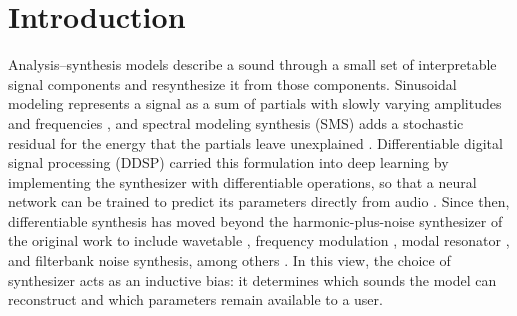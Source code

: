 
\section{Introduction}
\label{sec:intro}

Analysis--synthesis models describe a sound through a small set of interpretable signal components and resynthesize it from those components.
Sinusoidal modeling represents a signal as a sum of partials with slowly varying amplitudes and frequencies \citep{mcaulay1986speech}, and spectral modeling synthesis (SMS) adds a stochastic residual for the energy that the partials leave unexplained \citep{serra1990spectral}.
Differentiable digital signal processing (DDSP) carried this formulation into deep learning by implementing the synthesizer with differentiable operations, so that a neural network can be trained to predict its parameters directly from audio \citep{engel2020ddsp}.
Since then, differentiable synthesis has moved beyond the harmonic-plus-noise synthesizer of the original work to include wavetable \citep{shan2022differentiable}, frequency modulation \citep{caspe2022ddx7}, modal resonator \citep{diaz2023rigid}, and filterbank noise \citep{barahonarios2024noisebandnet} synthesis, among others \citep{hayes2024review}.
In this view, the choice of synthesizer acts as an inductive bias: it determines which sounds the model can reconstruct and which parameters remain available to a user.


